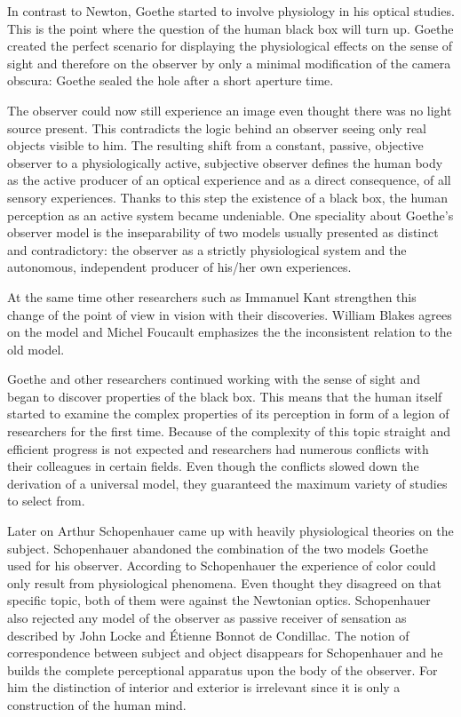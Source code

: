 \documentclass[12pt,a4paper]{article}
\begin{document}
In contrast to Newton, Goethe started to involve physiology in his optical studies. This is the point where
the question of the human black box will turn up. Goethe created the perfect scenario for displaying the
physiological effects on the sense of sight and therefore on the observer by only a minimal modification of the
camera obscura: Goethe sealed the hole after a short aperture time.

The observer could now still experience an image even thought there was no
light source present. This contradicts the logic behind an observer seeing only real objects visible to him.
The resulting shift from a constant, passive, objective observer to a physiologically active, subjective
observer defines the human body as the active producer of an optical experience and as a direct
consequence, of all sensory experiences.
Thanks to this step the existence of a black box, the human perception as an active system became
undeniable. One speciality about Goethe's observer model is the inseparability of two models usually
presented as distinct and contradictory: the observer as a strictly physiological system and the
autonomous, independent producer of his/her own experiences.

At the same time other researchers such as Immanuel Kant strengthen this change of the point of view
in vision with their discoveries. William Blakes agrees on the model and Michel Foucault
emphasizes the the inconsistent relation to the old model.

Goethe and other researchers continued working with the sense of sight and began to discover
properties of the black box.
This means that the human itself started to examine the complex properties of its perception
in form of a legion of researchers for the first time. Because of the complexity of this topic
straight and efficient progress is not expected and researchers had numerous conflicts with
their colleagues in certain fields. Even though the conflicts slowed down the derivation of a
universal model, they guaranteed the maximum variety of studies to select from.

Later on Arthur Schopenhauer came up with heavily physiological theories on the subject. Schopenhauer
abandoned the combination of the two models Goethe used for his observer. According to Schopenhauer
the experience of color could only result from physiological phenomena. Even thought they disagreed on
that specific topic, both of them were against the Newtonian optics. Schopenhauer also rejected any model
of the observer as passive receiver of sensation as described by John Locke and Étienne Bonnot de Condillac.
The notion of correspondence between subject and object disappears for Schopenhauer and he
builds the complete perceptional apparatus upon the body of the observer. For him the distinction of
interior and exterior is irrelevant since it is only a construction of the human mind.
\end{document}

